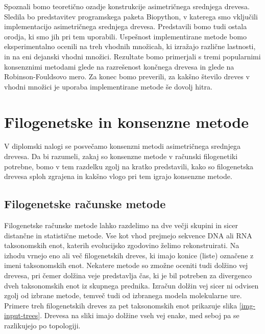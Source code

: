 \documentclass[a4paper, 12pt]{book}
\begin{document}
Spoznali bomo teoretično ozadje konstrukcije asimetričnega srednjega drevesa.
Sledila bo predstavitev programskega paketa Biopython, v katerega smo
vključili implementacijo asimetričnega srednjega drevesa. Predstavili bomo tudi ostala orodja, ki smo
jih pri tem uporabili. Uspešnost implementirane metode bomo eksperimentalno ocenili
na treh vhodnih množicah, ki izražajo različne lastnosti, in na eni dejanski vhodni 
množici. Rezultate bomo primerjali s tremi popularnimi konsenznimi metodami glede
na razrešenost končnega drevesa in glede na Robinson-Fouldsovo mero. 
Za  konec bomo preverili, za kakšno število dreves v vhodni množici je uporaba
implementirane metode še dovolj hitra.


\chapter{Filogenetske in konsenzne metode}

V diplomski nalogi se posvečamo konsenzni metodi asimetričnega srednjega drevesa. Da bi 
razumeli, zakaj so konsenzne metode v računski filogenetiki potrebne, bomo v tem 
razdelku zgolj na kratko predstavili, kako so filogenetska drevesa sploh zgrajena in 
kakšno vlogo pri tem igrajo konsenzne metode. 

\section{Filogenetske računske metode}

Filogenetske računske metode lahko razdelimo na dve večji skupini in sicer distančne in
statistične metode. Vse kot vhod prejmejo sekvence DNA ali RNA taksonomskih enot, 
katerih evolucijsko zgodovino želimo rekonstruirati. Na izhodu vrnejo eno ali
več filogenetskih dreves, ki imajo konice (liste) označene z imeni taksonomskih enot.
Nekatere metode so zmožne oceniti tudi dolžino vej drevesa, pri čemer dolžina veje
predstavlja čas, ki je bil potreben za divergenco dveh taksonomskih enot iz skupnega
prednika. Izračun dolžin vej sicer ni odvisen zgolj od izbrane metode, temveč tudi 
od izbranega modela molekularne ure. Primere treh filogenetskih dreves za pet 
taksonomskih enot prikazuje slika \ref{img-input-trees}. Drevesa na sliki imajo 
dolžine vseh vej enake, med seboj pa se razlikujejo po topologiji.
\end{document}
